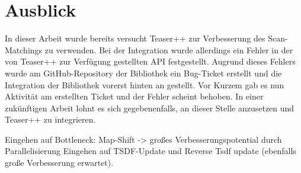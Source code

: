 \chapter{Ausblick}
\label{chapter:ausblick}

In dieser Arbeit wurde bereits versucht Teaser++ zur Verbesserung des Scan-Matchings zu verwenden. Bei der Integration wurde allerdings ein Fehler in der von Teaser++ zur Verfügung gestellten API festgestellt. Augrund dieses Fehlers wurde am GitHub-Repository der Bibliothek ein Bug-Ticket erstellt und die Integration der Bibliothek vorerst hinten an gestellt. Vor Kurzem gab es nun Aktivität am erstellten Ticket und der Fehler scheint behoben. In einer zukünftigen Arbeit lohnt es sich gegebenenfalls, an dieser Stelle anzusetzen und Teaser++ zu integrieren.

Eingehen auf Bottleneck: Map-Shift -> großes Verbesserungspotential durch Parallelisierung
Eingehen auf TSDF-Update und Reverse Tsdf update (ebenfalls große Verbesserung erwartet).
